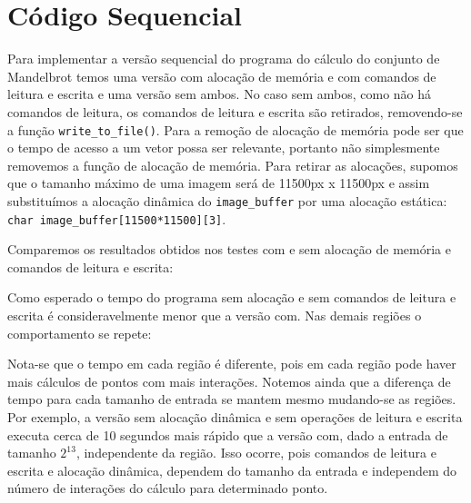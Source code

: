 \documentclass[12pt]{article}
\newcommand{\code}[1]{\texttt{#1}}
\begin{document}
\section{Código Sequencial}
Para implementar a versão sequencial do programa do cálculo do conjunto de Mandelbrot temos uma versão com alocação de memória e com comandos de leitura e escrita e uma versão sem ambos. No caso sem ambos, como não há comandos de leitura, os comandos de leitura e escrita são retirados, removendo-se a função \code{write\_to\_file()}. Para a remoção de alocação de memória pode ser que o tempo de acesso a um vetor possa ser relevante, portanto não simplesmente removemos a função de alocação de memória. Para retirar as alocações, supomos que o tamanho máximo de uma imagem será de 11500px x 11500px e assim substituímos a alocação dinâmica do \code{image\_buffer} por uma alocação estática: \code{char image\_buffer[11500*11500][3]}.

Comparemos os resultados obtidos nos testes com e sem alocação de memória e comandos de leitura e escrita:

\begin{figure}[H]
\end{figure}

Como esperado o tempo do programa sem alocação e sem comandos de leitura e escrita é consideravelmente menor que a versão com. Nas demais regiões o comportamento se repete:

\begin{figure}[H]
\end{figure}
\begin{figure}[H]
\end{figure}
\begin{figure}[H]
\end{figure}

Nota-se que o tempo em cada região é diferente, pois em cada região pode haver mais cálculos de pontos com mais interações. Notemos ainda que a diferença de tempo para cada tamanho de entrada se mantem mesmo mudando-se as regiões. Por exemplo, a versão sem alocação dinâmica e sem operações de leitura e escrita executa cerca de 10 segundos mais rápido que a versão com, dado a entrada de tamanho $2^{13}$, independente da região. Isso ocorre, pois comandos de leitura e escrita e alocação dinâmica, dependem do tamanho da entrada e independem do número de interações do cálculo para determinado ponto.
\end{document}
